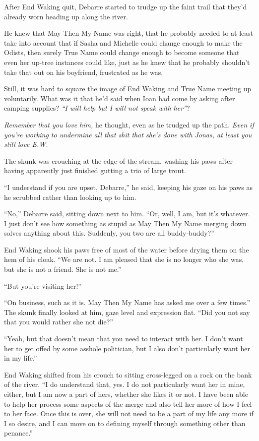After End Waking quit, Debarre started to trudge up the faint trail that they'd already worn heading up along the river.

He knew that May Then My Name was right, that he probably needed to at least take into account that if Sasha and Michelle could change enough to make the Odists, then surely True Name could change enough to become someone that even her up-tree instances could like, just as he knew that he probably shouldn't take that out on his boyfriend, frustrated as he was.

Still, it was hard to square the image of End Waking and True Name meeting up voluntarily. What was it that he'd said when Ioan had come by asking after camping supplies? \emph{``I will help but I will not speak with her''}?

\emph{Remember that you love him,} he thought, even as he trudged up the path. \emph{Even if you're working to undermine all that shit that she's done with Jonas, at least you still love E.W.}

The skunk was crouching at the edge of the stream, washing his paws after having apparently just finished gutting a trio of large trout.

``I understand if you are upset, Debarre,'' he said, keeping his gaze on his paws as he scrubbed rather than looking up to him.

``No,'' Debarre said, sitting down next to him. ``Or, well, I am, but it's whatever. I just don't see how something as stupid as May Then My Name merging down solves anything about this. Suddenly, you two are all buddy-buddy?''

End Waking shook his paws free of most of the water before drying them on the hem of his cloak. ``We are not. I am pleased that she is no longer who she was, but she is not a friend. She is not me.''

``But you're visiting her!''

``On business, such as it is. May Then My Name has asked me over a few times.'' The skunk finally looked at him, gaze level and expression flat. ``Did you not say that you would rather she not die?''

``Yeah, but that doesn't mean that you need to interact with her. I don't want her to get offed by some asshole politician, but I also don't particularly want her in my life.''

End Waking shifted from his crouch to sitting cross-legged on a rock on the bank of the river. ``I do understand that, yes. I do not particularly want her in mine, either, but I am now a part of hers, whether she likes it or not. I have been able to help her process some aspects of the merge and also tell her more of how I feel to her face. Once this is over, she will not need to be a part of my life any more if I so desire, and I can move on to defining myself through something other than penance.''

